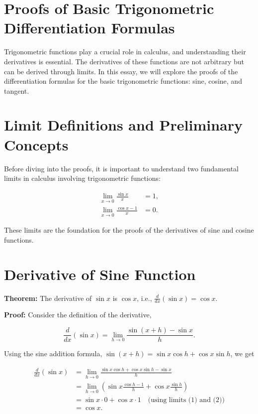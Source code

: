 \documentclass[a4paper,12pt]{book}
\begin{document}
\section*{Proofs of Basic Trigonometric Differentiation Formulas}

Trigonometric functions play a crucial role in calculus, and understanding their derivatives is essential. The derivatives of these functions are not arbitrary but can be derived through limits. In this essay, we will explore the proofs of the differentiation formulas for the basic trigonometric functions: sine, cosine, and tangent. 

\section*{Limit Definitions and Preliminary Concepts}

Before diving into the proofs, it is important to understand two fundamental limits in calculus involving trigonometric functions:

\begin{align}
    \lim_{x \to 0} \frac{\sin x}{x} &= 1, \\
    \lim_{x \to 0} \frac{\cos x - 1}{x} &= 0.
\end{align}

These limits are the foundation for the proofs of the derivatives of sine and cosine functions.

\section*{Derivative of Sine Function}

\textbf{Theorem:} The derivative of $\sin x$ is $\cos x$, i.e., $\frac{d}{dx}(\sin x) = \cos x$.

\textbf{Proof:} Consider the definition of the derivative,

\begin{equation}
    \frac{d}{dx}(\sin x) = \lim_{h \to 0} \frac{\sin(x+h) - \sin x}{h}.
\end{equation}

Using the sine addition formula, $\sin(x+h) = \sin x \cos h + \cos x \sin h$, we get

\begin{align*}
    \frac{d}{dx}(\sin x) &= \lim_{h \to 0} \frac{\sin x \cos h + \cos x \sin h - \sin x}{h} \\
                         &= \lim_{h \to 0} \left(\sin x \frac{\cos h - 1}{h} + \cos x \frac{\sin h}{h}\right) \\
                         &= \sin x \cdot 0 + \cos x \cdot 1 \quad \text{(using limits (1) and (2))} \\
                         &= \cos x.
\end{align*}
\end{document}
